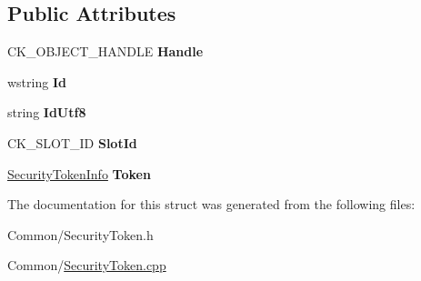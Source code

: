 \subsection*{Public Attributes}
\begin{DoxyCompactItemize}
\item 
\mbox{\label{struct_gost_crypt_1_1_security_token_keyfile_a94a78e7536282e2144c7248e3f7c461c}} 
C\+K\+\_\+\+O\+B\+J\+E\+C\+T\+\_\+\+H\+A\+N\+D\+LE {\bfseries Handle}
\item 
\mbox{\label{struct_gost_crypt_1_1_security_token_keyfile_a0fdf0d75024449aa01e536ce9c0301d5}} 
wstring {\bfseries Id}
\item 
\mbox{\label{struct_gost_crypt_1_1_security_token_keyfile_a2cad988e53ae94ab61d5881bcdfa034f}} 
string {\bfseries Id\+Utf8}
\item 
\mbox{\label{struct_gost_crypt_1_1_security_token_keyfile_a0f90710b0243db9a8315cb0b7bac4598}} 
C\+K\+\_\+\+S\+L\+O\+T\+\_\+\+ID {\bfseries Slot\+Id}
\item 
\mbox{\label{struct_gost_crypt_1_1_security_token_keyfile_ad97fd6589790d8092bdc4edce721a819}} 
\hyperlink{struct_gost_crypt_1_1_security_token_info}{Security\+Token\+Info} {\bfseries Token}
\end{DoxyCompactItemize}


The documentation for this struct was generated from the following files\+:\begin{DoxyCompactItemize}
\item 
Common/Security\+Token.\+h\item 
Common/\hyperlink{_security_token_8cpp}{Security\+Token.\+cpp}\end{DoxyCompactItemize}
